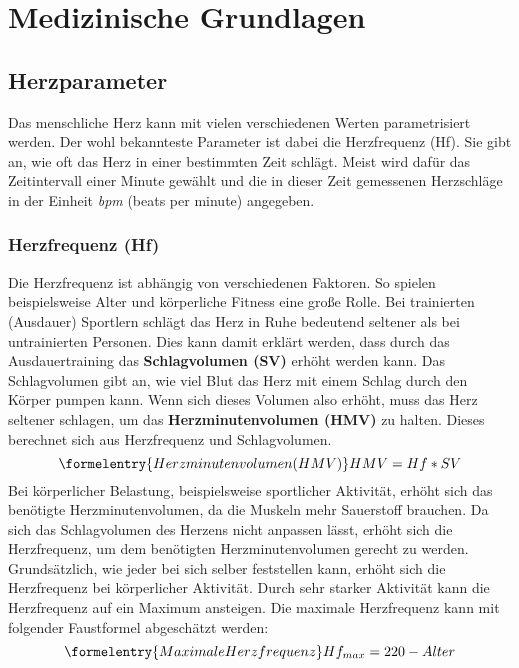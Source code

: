 
\chapter{Medizinische Grundlagen}

\section{Herzparameter}
Das menschliche Herz kann mit vielen verschiedenen Werten parametrisiert werden. Der wohl bekannteste Parameter ist dabei die Herzfrequenz (Hf). Sie gibt an, wie oft das Herz in einer bestimmten Zeit schlägt. Meist wird dafür das Zeitintervall einer Minute gewählt und die in dieser Zeit gemessenen Herzschläge in der Einheit \emph{bpm} (beats per minute) angegeben. 
\subsection{Herzfrequenz (Hf)} \label {subsec:hf}
Die Herzfrequenz ist abhängig von verschiedenen Faktoren. So spielen beispielsweise Alter und körperliche Fitness eine große Rolle. Bei trainierten (Ausdauer) Sportlern schlägt das Herz in Ruhe bedeutend seltener als bei untrainierten Personen. Dies kann damit erklärt werden, dass durch das Ausdauertraining das \textbf{Schlagvolumen (SV)} erhöht werden kann. Das Schlagvolumen gibt an, wie viel Blut das Herz mit einem Schlag durch den Körper pumpen kann. Wenn sich dieses Volumen also erhöht, muss das Herz seltener schlagen, um das \textbf{Herzminutenvolumen (HMV)} zu halten. Dieses berechnet sich aus Herzfrequenz und Schlagvolumen. \cite{herz} 
\begin{equation}\formelentry{Herzminutenvolumen (HMV)}
	HMV = Hf * SV
\end{equation} 
Bei körperlicher Belastung, beispielsweise sportlicher Aktivität, erhöht sich das benötigte Herzminutenvolumen, da die Muskeln mehr Sauerstoff brauchen. Da sich das Schlagvolumen des Herzens nicht anpassen lässt, erhöht sich die Herzfrequenz, um dem benötigten Herzminutenvolumen gerecht zu werden. Grundsätzlich, wie jeder bei sich selber feststellen kann, erhöht sich die Herzfrequenz bei körperlicher Aktivität. Durch sehr starker Aktivität kann die Herzfrequenz auf ein Maximum ansteigen. Die maximale Herzfrequenz kann mit folgender Faustformel abgeschätzt werden: 
\begin{equation}\formelentry{Maximale Herzfrequenz}
	Hf_{max} = 220 - Alter
\end{equation}
